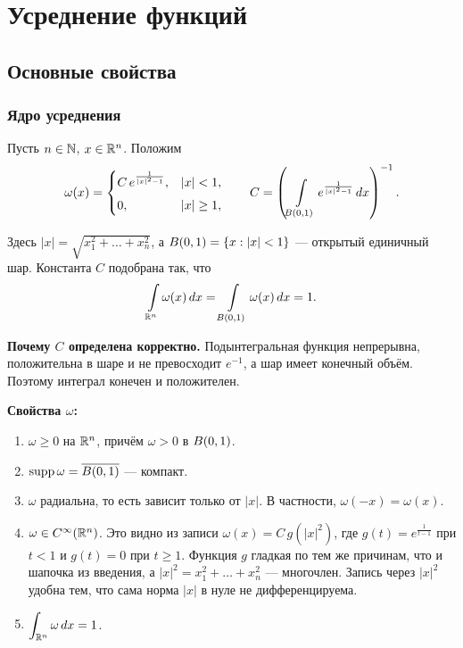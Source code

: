 \section{Усреднение функций}

\subsection{Основные свойства}

\subsubsection*{Ядро усреднения}

\begin{definition}
Пусть $n \in \mathbb{N}$, $x \in \mathbb{R}^n$. Положим
\[
  \omega(x) =
  \begin{cases}
    C\, e^{\frac{1}{|x|^2 - 1}}, & |x| < 1, \\[4pt]
    0, & |x| \ge 1,
  \end{cases}
  \qquad
  C = \left( \int\limits_{B(0,1)} e^{\frac{1}{|x|^2 - 1}}\, dx \right)^{-1} .
\]
\end{definition}

Здесь $|x| = \sqrt{x_1^2 + \dots + x_n^2}$, а $B(0,1) = \{x : |x| < 1\}$ — открытый
единичный шар. Константа $C$ подобрана так, что
\[
  \int\limits_{\mathbb{R}^n} \omega(x)\, dx = \int\limits_{B(0,1)} \omega(x)\, dx = 1 .
\]

\begin{idea}
\textbf{Почему $C$ определена корректно.} Подынтегральная функция непрерывна, положительна
в шаре и не превосходит $e^{-1}$, а шар имеет конечный объём. Поэтому интеграл конечен
и положителен.
\end{idea}

\textbf{Свойства $\omega$:}
\begin{enumerate}
  \item $\omega \ge 0$ на $\mathbb{R}^n$, причём $\omega > 0$ в $B(0,1)$.
  \item $\operatorname{supp} \omega = \overline{B(0,1)}$ — компакт.
  \item $\omega$ радиальна, то есть зависит только от $|x|$. В частности,
        $\omega(-x) = \omega(x)$.
  \item $\omega \in C^\infty(\mathbb{R}^n)$. Это видно из записи $\omega(x) = C\, g(|x|^2)$,
        где $g(t) = e^{\frac{1}{t-1}}$ при $t < 1$ и $g(t) = 0$ при $t \ge 1$. Функция $g$
        гладкая по тем же причинам, что и шапочка из введения, а
        $|x|^2 = x_1^2+\dots+x_n^2$ — многочлен. Запись через $|x|^2$ удобна тем, что сама
        норма $|x|$ в нуле не дифференцируема.
  \item $\displaystyle\int_{\mathbb{R}^n} \omega\,dx = 1$.
\end{enumerate}

